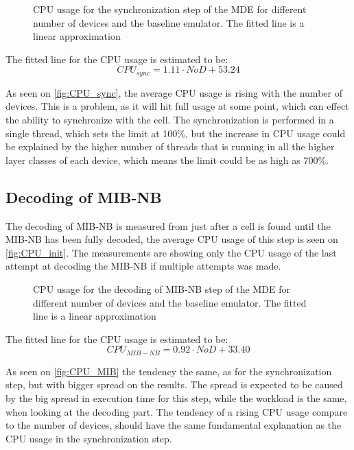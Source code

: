 \begin{figure}[H]
\centering
\resizebox{0.5\textwidth}{!}{
}
\caption{CPU usage for the synchronization step of the MDE for different number of devices and the baseline emulator. The fitted line is a linear approximation}
\label{fig:CPU_sync}
\end{figure}

The fitted line for the CPU usage is estimated to be:
\begin{equation}
CPU_{sync} = 1.11 \cdot NoD + 53.24
\end{equation}

As seen on \autoref{fig:CPU_sync}, the average CPU usage is rising with the number of devices. This is a problem, as it will hit full usage at some point, which can effect the ability to synchronize with the cell. The synchronization is performed in a single thread, which sets the limit at 100\%, but the increase in CPU usage could be explained by the higher number of threads that is running in all the higher layer classes of each device, which means the limit could be as high as 700\%. 

\subsection{Decoding of MIB-NB}
The decoding of MIB-NB is measured from just after a cell is found until the MIB-NB has been fully decoded, the average CPU usage of this step is seen on \autoref{fig:CPU_init}. The measurements are showing only the CPU usage of the last attempt at decoding the MIB-NB if multiple attempts was made.

\begin{figure}[H]
\centering
\resizebox{0.5\textwidth}{!}{
}
\caption{CPU usage for the decoding of MIB-NB step of the MDE for different number of devices and the baseline emulator. The fitted line is a linear approximation}
\label{fig:CPU_MIB}
\end{figure}

The fitted line for the CPU usage is estimated to be:
\begin{equation}
CPU_{MIB-NB} = 0.92 \cdot NoD + 33.40
\end{equation}


As seen on \autoref{fig:CPU_MIB} the tendency the same, as for the synchronization step, but with bigger spread on the results. The spread is expected to be caused by the big spread in execution time for this step, while the workload is the same, when looking at the decoding part. The tendency of a rising CPU usage compare to the number of devices, should have the same fundamental explanation as the CPU usage in the synchronization step.

